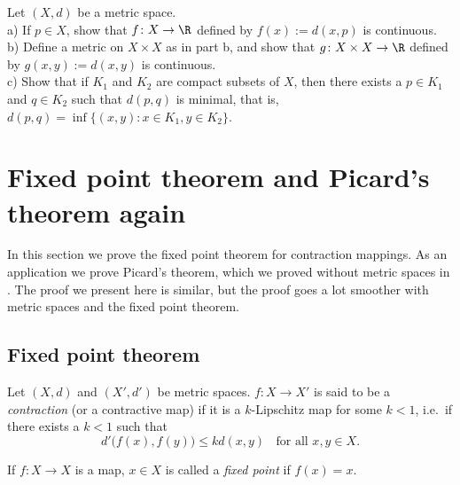 \documentclass[12pt]{book}
\begin{document}
\begin{exercise}
Let $(X,d)$ be a metric space.\\
a) If $p \in X$,
show that $f \colon X \to \R$ defined
by $f(x) := d(x,p)$ is continuous.
\\
b) Define a metric on $X \times X$ as in  part
b, and show that $g \colon X \times X \to \R$ defined by
$g(x,y) := d(x,y)$ is continuous.
\\
c) Show that if $K_1$ and $K_2$ are compact subsets of $X$, then
there exists a $p \in K_1$ and $q \in K_2$ such that $d(p,q)$ is minimal,
that is, $d(p,q) = \inf \{ (x,y) \colon x \in K_1, y \in K_2 \}$.
\end{exercise}


\sectionnewpage
\section{Fixed point theorem and Picard's theorem again}
\label{sec:metpicard}


In this section we prove the fixed point theorem for contraction
mappings.
As an application we prove Picard's theorem, which we proved
without metric spaces in .
The proof we present here is similar, but the proof goes a lot
smoother with metric spaces and the fixed point theorem.

\subsection*{Fixed point theorem}

\begin{defn}
Let $(X,d)$ and $(X',d')$ be metric spaces.
$f \colon X \to X'$ is said to be a \emph{contraction}
(or a contractive map) if it is
a $k$-Lipschitz map for some $k < 1$, i.e.\ if there exists a $k < 1$ such that
\begin{equation*}
d'\bigl(f(x),f(y)\bigr) \leq k d(x,y)
\ \ \ \ \text{for all } x,y \in X.
\end{equation*}

\medskip

If $f \colon X \to X$ is a map, $x \in X$ is called a \emph{fixed point}
if $f(x)=x$.
\end{defn}
\end{document}
